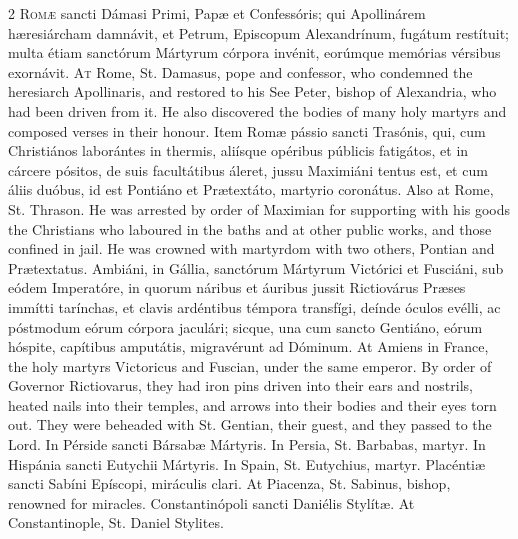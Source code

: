 \begin{paracol}{2}
\lettrine[lines=2]{R}{omæ} sancti Dámasi 
 Primi, Papæ et Confessóris; qui Apollinárem hæresiárcham damnávit, et Petrum, 
 Episcopum Alexandrínum, fugátum restítuit; multa étiam sanctórum Mártyrum 
 córpora invénit, eorúmque memórias vérsibus exornávit.
\switchcolumn
{}
\lettrine[lines=2]{A}{t} Rome, St. Damasus, pope and 
 confessor, who condemned the heresiarch Apollinaris, and restored to his See 
 Peter, bishop of Alexandria, who had been driven from it. He also 
 discovered the bodies of many holy martyrs and composed verses in their 
 honour.
\switchcolumn*
{}
Item Romæ pássio sancti 
 Trasónis, qui, cum Christiános laborántes in thermis, aliísque opéribus 
 públicis fatigátos, et in cárcere pósitos, de suis facultátibus áleret, 
 jussu Maximiáni tentus est, et cum áliis duóbus, id est Pontiáno et 
 Prætextáto, martyrio coronátus.
\switchcolumn
{}
Also at Rome, St. Thrason. He 
 was arrested by order of Maximian for supporting with his goods the 
 Christians who laboured in the baths and at other public works, and those 
 confined in jail. He was crowned with martyrdom with two others, Pontian and 
 Prætextatus.
\switchcolumn*
{}
Ambiáni, in Gállia, 
 sanctórum Mártyrum Victórici et Fusciáni, sub eódem Imperatóre, in quorum 
 náribus et áuribus jussit Rictiovárus Præses immítti tarínchas, et clavis 
 ardéntibus témpora transfígi, deínde óculos evélli, ac póstmodum eórum 
 córpora jaculári; sicque, una cum sancto Gentiáno, eórum hóspite, capítibus 
 amputátis, migravérunt ad Dóminum.
\switchcolumn
{}
At Amiens in France, the holy 
 martyrs Victoricus and Fuscian, under the same emperor. By order of 
 Governor Rictiovarus, they had iron pins driven into their ears and 
 nostrils, heated nails into their temples, and arrows into their bodies and 
 their eyes torn out. They were beheaded with St. Gentian, their guest, 
 and they passed to the Lord.
\switchcolumn*
{}
In Pérside sancti 
 Bársabæ Mártyris.
\switchcolumn
{}
In Persia, St. Barbabas, martyr.
\switchcolumn*
{}
In Hispánia sancti 
 Eutychii Mártyris.
\switchcolumn
{}
In Spain, St. Eutychius, martyr.
\switchcolumn*
{}
Placéntiæ sancti Sabíni 
 Epíscopi, miráculis clari.
\switchcolumn
{}
At Piacenza, St. Sabinus, bishop, 
 renowned for miracles.
\switchcolumn*
{}
Constantinópoli sancti 
 Daniélis Stylítæ.
\switchcolumn
{}
At Constantinople, St. Daniel 
 Stylites.
\switchcolumn*
{}
\end{paracol}


